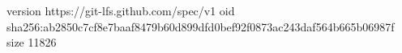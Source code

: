 version https://git-lfs.github.com/spec/v1
oid sha256:ab2850c7cf8e7baaf8479b60d899dfd0bef92f0873ac243daf564b665b06987f
size 11826
